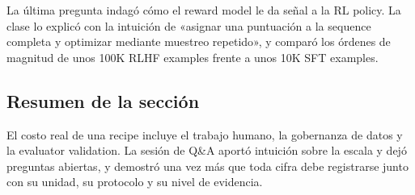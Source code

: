 La última pregunta indagó cómo el reward model le da señal a la RL policy. La clase lo explicó con la intuición de «asignar una puntuación a la sequence completa y optimizar mediante muestreo repetido», y comparó los órdenes de magnitud de unos 100K RLHF examples frente a unos 10K SFT examples.


\subsection{Resumen de la sección}

El costo real de una recipe incluye el trabajo humano, la gobernanza de datos y la evaluator validation. La sesión de Q\&A aportó intuición sobre la escala y dejó preguntas abiertas, y demostró una vez más que toda cifra debe registrarse junto con su unidad, su protocolo y su nivel de evidencia.

